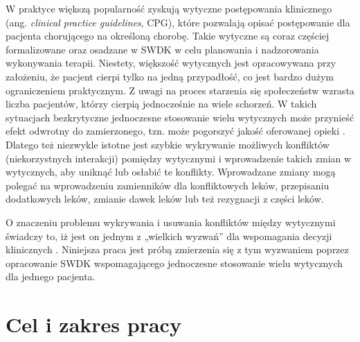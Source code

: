 \begin{spacing}{1.5}
W praktyce większą popularność zyskują wytyczne postępowania klinicznego (ang. \textit{clinical practice guidelines}, CPG), które pozwalają opisać postępowanie dla pacjenta chorującego na określoną chorobę. Takie wytyczne są coraz częściej formalizowane oraz osadzane w SWDK w celu planowania i nadzorowania wykonywania terapii. Niestety, większość wytycznych jest opracowywana przy założeniu, że pacjent cierpi tylko na jedną przypadłość, co jest bardzo dużym ograniczeniem praktycznym. Z uwagi na proces starzenia się społeczeństw wzrasta liczba pacjentów, którzy cierpią jednocześnie na wiele schorzeń. W takich sytuacjach bezkrytyczne jednoczesne stosowanie wielu wytycznych może przynieść efekt odwrotny do zamierzonego, tzn. może pogorszyć jakość oferowanej opieki \cite{Boyd05}. Dlatego też niezwykle istotne jest szybkie wykrywanie możliwych konfliktów (niekorzystnych interakcji) pomiędzy wytycznymi i wprowadzenie takich zmian w wytycznych, aby uniknąć lub osłabić te konflikty. Wprowadzane zmiany mogą polegać na wprowadzeniu zamienników dla konfliktowych leków, przepisaniu dodatkowych leków, zmianie dawek leków lub też rezygnacji z części leków.

O znaczeniu problemu wykrywania i usuwania konfliktów między wytycznymi świadczy to, iż jest on jednym z „wielkich wyzwań” dla wspomagania decyzji klinicznych \cite{Sittig08}. Niniejsza praca jest próbą zmierzenia się z tym wyzwaniem poprzez opracowanie SWDK  wspomagającego jednoczesne stosowanie wielu wytycznych dla jednego pacjenta. 


\section{Cel i zakres pracy}


\end{spacing}
